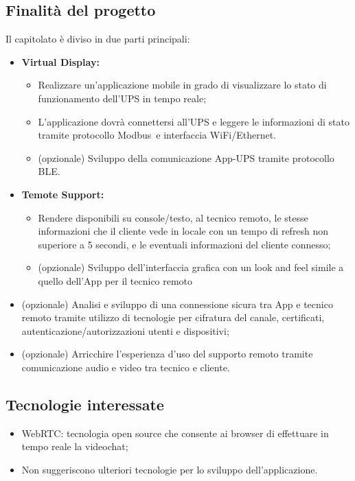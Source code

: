 	\subsection{Finalità del progetto}
		Il capitolato è diviso in due parti principali:
		\begin {itemize}
			\item \textbf{Virtual Display:}
			\begin{itemize}
				\item Realizzare un’applicazione mobile in grado di visualizzare lo stato di funzionamento dell’UPS in tempo reale;
				\item L’applicazione dovrà connettersi all’UPS e leggere le informazioni di stato tramite protocollo Modbus\glo\ e interfaccia WiFi/Ethernet.
				\item (opzionale) Sviluppo della comunicazione App-UPS tramite protocollo BLE\glo.
			\end{itemize}
			\item \textbf{Temote Support:}
			\begin{itemize}
				\item Rendere disponibili su console/testo, al tecnico remoto, le stesse informazioni che il cliente vede in locale con un tempo di refresh non superiore a 5 secondi, e le eventuali informazioni del cliente connesso;
				\item (opzionale) Sviluppo dell’interfaccia grafica con un look and feel simile a quello dell’App per il tecnico remoto
			\end{itemize}
			\item (opzionale) Analisi e sviluppo di una connessione sicura tra App e tecnico remoto tramite utilizzo di	tecnologie per cifratura del canale, certificati, autenticazione/autorizzazioni utenti e dispositivi;
			\item (opzionale) Arricchire l’esperienza d’uso del supporto remoto tramite comunicazione audio e video tra	tecnico e cliente.
		\end {itemize}

	\subsection {Tecnologie interessate}
		\begin {itemize}
			\item WebRTC: tecnologia open source che consente ai browser di effettuare in tempo reale la videochat;
			\item Non suggeriscono ulteriori tecnologie per lo sviluppo dell'applicazione.
		\end {itemize}

